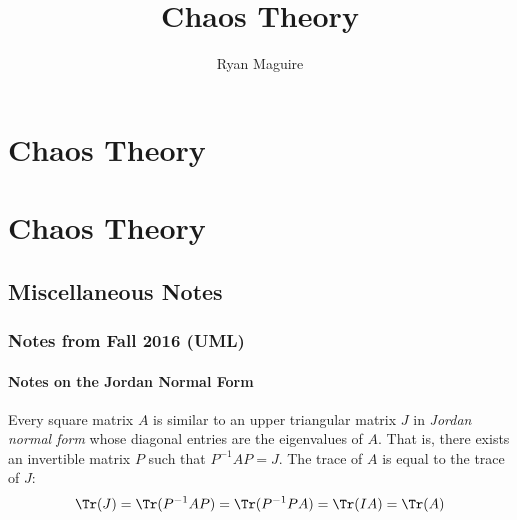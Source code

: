 \documentclass[crop=false,class=book,oneside]{standalone}
\begin{document}
    \ifx\ifmathcourses\undefined
        \title{Chaos Theory}
        \author{Ryan Maguire}
        \date{\vspace{-5ex}}
        \maketitle
        \tableofcontents
        \chapter*{Chaos Theory}
        \setcounter{chapter}{1}
    \else
        \chapter{Chaos Theory}
    \fi
    \section{Miscellaneous Notes}
        \subsection{Notes from Fall 2016 (UML)}
            \subsubsection{Notes on the Jordan Normal Form}
                Every square matrix $A$ is similar to an upper
                triangular matrix $J$ in
                \textit{Jordan normal form} whose diagonal entries
                are the eigenvalues of $A$. That is, there exists
                an invertible matrix $P$ such that
                $P^{-1}AP=J$. The trace of $A$ is equal to the
                trace of $J$:
                \begin{equation*}
                    \Tr(J)
                    =\Tr(P^{-1}AP)
                    =\Tr(P^{-1}PA)
                    =\Tr(IA)=\Tr(A)
                \end{equation*}
\end{document}
